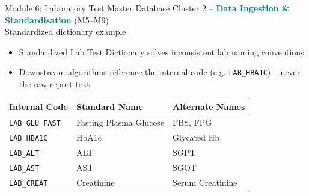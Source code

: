 \documentclass[9pt,aspectratio=169]{beamer}
\begin{document}
\begin{frame}[t]{Module 6: Laboratory Test Master Database}
\textcolor{black!55}{\scriptsize Cluster 2 -- \textcolor{teal}{\textbf{Data Ingestion \& Standardisation}} (M5--M9) \\ Standardized dictionary example}\\[2pt]
\begin{itemize}
\scriptsize
\item Standardized Lab Test Dictionary solves inconsistent lab naming conventions
\item Downstream algorithms reference the internal code (e.g. \texttt{LAB\_HBA1C}) -- never the raw report text
\end{itemize}
\vspace{4pt}
\begin{center}\scriptsize
\begin{tabular}{lll}
\toprule
\textbf{Internal Code} & \textbf{Standard Name} & \textbf{Alternate Names} \\
\midrule
\texttt{LAB\_GLU\_FAST} & Fasting Plasma Glucose & FBS, FPG \\
\texttt{LAB\_HBA1C} & HbA1c & Glycated Hb \\
\texttt{LAB\_ALT} & ALT & SGPT \\
\texttt{LAB\_AST} & AST & SGOT \\
\texttt{LAB\_CREAT} & Creatinine & Serum Creatinine \\
\bottomrule
\end{tabular}
\end{center}
\end{frame}
\end{document}
